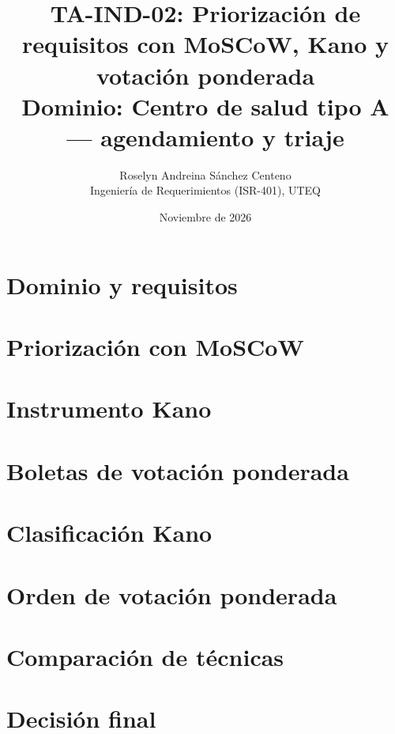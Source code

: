 \documentclass[10pt,a4paper]{article}
\title{TA-IND-02: Priorización de requisitos con MoSCoW, Kano y votación ponderada\\
\large Dominio: Centro de salud tipo A --- agendamiento y triaje}
\author{Roselyn Andreina Sánchez Centeno\\
Ingeniería de Requerimientos (ISR-401), UTEQ}
\date{Noviembre de 2026}
\begin{document}
\maketitle

\section{Dominio y requisitos}


\section{Priorización con MoSCoW}


\section{Instrumento Kano}


\section{Boletas de votación ponderada}


\section{Clasificación Kano}


\section{Orden de votación ponderada}


\section{Comparación de técnicas}


\section{Decisión final}

\end{document}
